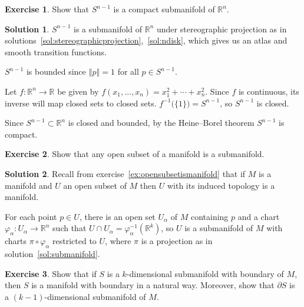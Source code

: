 \documentclass[11pt, a4paper]{report}
\theoremstyle{definition}
\newtheorem{exercise}{Exercise}[part]
\newtheorem{solution}{Solution}[part]
\newenvironment{ex}{\begin{exercise}}{\end{exercise}\pagebreak[1]}
\newenvironment{sol}{\begin{solution}}{\end{solution}\pagebreak[3]}
\newcommand*{\norm}[1]{\ensuremath{\left\Vert#1\right\Vert}}
\begin{document}
\begin{ex}

Show that $S^{n - 1}$ is a compact submanifold of $\mathbb{R}^n$.

\end{ex}

\begin{sol}

$S^{n - 1}$ is a submanifold of $\mathbb{R}^n$ under stereographic projection as in solutions~\ref{sol:stereographicprojection},~\ref{sol:ndisk}, which gives us an atlas and smooth transition functions.

$S^{n - 1}$ is bounded since $\norm{p} = 1$ for all $p \in S^{n - 1}$.

Let $f: \mathbb{R}^n \to \mathbb{R}$ be given by $f(x_1, \ldots, x_n) = x_1^2 + \cdots + x_n^2$. Since $f$ is continuous, its inverse will map closed sets to closed sets. $f^{-1}\bigl(\{1\}\bigr) = S^{n - 1}$, so $S^{n - 1}$ is closed.

Since $S^{n - 1} \subset \mathbb{R}^n$ is closed and bounded, by the Heine--Borel theorem $S^{n - 1}$ is compact.

\end{sol}

\begin{ex}

Show that any open subset of a manifold is a submanifold.

\end{ex}

\begin{sol}

Recall from exercise~\ref{ex:opensubsetismanifold} that if $M$ is a manifold and $U$ an open subset of $M$ then $U$ with its induced topology is a manifold.

For each point $p \in U$, there is an open set $U_\alpha$ of $M$ containing $p$ and a chart $\varphi_\alpha: U_\alpha \to \mathbb{R}^n$ such that $U \cap U_\alpha = \varphi_\alpha^{-1}(\mathbb{R}^k)$, so $U$ is a submanifold of $M$ with charts $\pi \circ \varphi_\alpha$ restricted to $U$, where $\pi$ is a projection as in solution~\ref{sol:submanifold}.

\end{sol}

\begin{ex}

Show that if $S$ is a $k$-dimensional submanifold with boundary of $M$, then $S$ is a manifold with boundary in a natural way.
Moreover, show that $\partial S$ is a $(k - 1)$-dimensional submanifold of $M$.

\end{ex}
\end{document}
